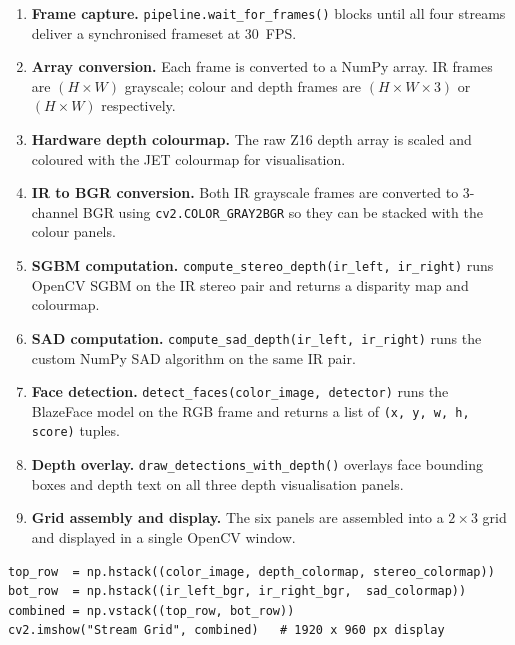 \documentclass[12pt, a4paper]{article}
\newcommand{\code}[1]{\texttt{\small#1}}
\begin{document}
\begin{enumerate}
  \item \textbf{Frame capture.}
        \code{pipeline.wait\_for\_frames()} blocks until all four streams
        deliver a synchronised frameset at 30~FPS.

  \item \textbf{Array conversion.}
        Each frame is converted to a NumPy array.
        IR frames are $(H \times W)$ grayscale; colour and depth frames are
        $(H \times W \times 3)$ or $(H \times W)$ respectively.

  \item \textbf{Hardware depth colourmap.}
        The raw Z16 depth array is scaled and coloured with the JET colourmap
        for visualisation.

  \item \textbf{IR to BGR conversion.}
        Both IR grayscale frames are converted to 3-channel BGR using
        \code{cv2.COLOR\_GRAY2BGR} so they can be stacked with the colour panels.

  \item \textbf{SGBM computation.}
        \code{compute\_stereo\_depth(ir\_left, ir\_right)} runs OpenCV SGBM on
        the IR stereo pair and returns a disparity map and colourmap.

  \item \textbf{SAD computation.}
        \code{compute\_sad\_depth(ir\_left, ir\_right)} runs the custom NumPy
        SAD algorithm on the same IR pair.

  \item \textbf{Face detection.}
        \code{detect\_faces(color\_image, detector)} runs the BlazeFace model
        on the RGB frame and returns a list of \code{(x, y, w, h, score)} tuples.

  \item \textbf{Depth overlay.}
        \code{draw\_detections\_with\_depth()} overlays face bounding boxes and
        depth text on all three depth visualisation panels.

  \item \textbf{Grid assembly and display.}
        The six panels are assembled into a $2 \times 3$ grid and displayed in
        a single OpenCV window.
\end{enumerate}

\begin{lstlisting}[caption={Grid assembly (live\_stream.py lines 208--212)}]
top_row  = np.hstack((color_image, depth_colormap, stereo_colormap))
bot_row  = np.hstack((ir_left_bgr, ir_right_bgr,  sad_colormap))
combined = np.vstack((top_row, bot_row))
cv2.imshow("Stream Grid", combined)   # 1920 x 960 px display
\end{lstlisting}
\end{document}
